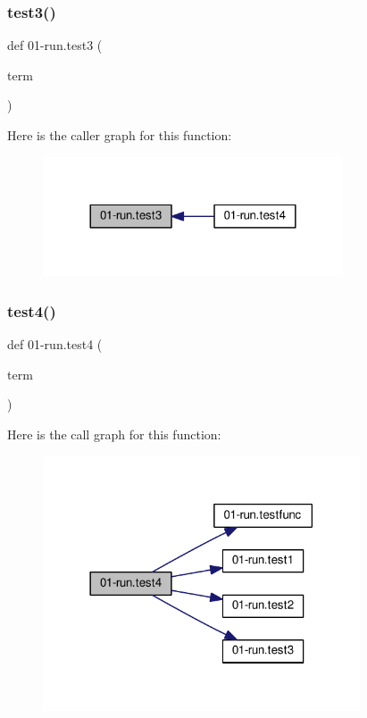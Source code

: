 \subsubsection{\texorpdfstring{test3()}{test3()}}
{\footnotesize\ttfamily def 01-\/run.\+test3 (\begin{DoxyParamCaption}\item[{}]{term }\end{DoxyParamCaption})}

Here is the caller graph for this function\+:
\nopagebreak
\begin{figure}[H]
\begin{center}
\leavevmode
\includegraphics[width=252pt]{namespace01-run_a257feca6e1f04f60b7588f885a4a4467_icgraph}
\end{center}
\end{figure}
\mbox{\label{namespace01-run_accc621a2eeba8d4a50746f6737268706}} 
\subsubsection{\texorpdfstring{test4()}{test4()}}
{\footnotesize\ttfamily def 01-\/run.\+test4 (\begin{DoxyParamCaption}\item[{}]{term }\end{DoxyParamCaption})}

Here is the call graph for this function\+:
\nopagebreak
\begin{figure}[H]
\begin{center}
\leavevmode
\includegraphics[width=266pt]{namespace01-run_accc621a2eeba8d4a50746f6737268706_cgraph}
\end{center}
\end{figure}
\mbox{\label{namespace01-run_a798e8a5d7092f930c4ca7ce48d658113}} 
